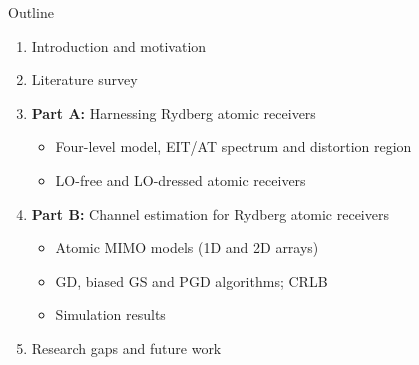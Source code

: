 \documentclass[10pt,xcolor=x11names,compress,aspectratio=169]{beamer}
\begin{document}
\begin{frame}{Outline}
\vspace{2mm}
\begin{enumerate}\setlength\itemsep{8pt}
  \item Introduction and motivation
  \item Literature survey
  \item \textbf{Part A:} Harnessing Rydberg atomic receivers~\cite{chen2025harnessing}
  \begin{itemize}\small\setlength\itemsep{2pt}
    \item Four-level model, EIT/AT spectrum and distortion region
    \item LO-free and LO-dressed atomic receivers
  \end{itemize}
  \item \textbf{Part B:} Channel estimation for Rydberg atomic receivers~\cite{xu2025channel}
  \begin{itemize}\small\setlength\itemsep{2pt}
    \item Atomic MIMO models (1D and 2D arrays)
    \item GD, biased GS and PGD algorithms; CRLB
    \item Simulation results
  \end{itemize}
  \item Research gaps and future work
\end{enumerate}
\end{frame}
\end{document}
